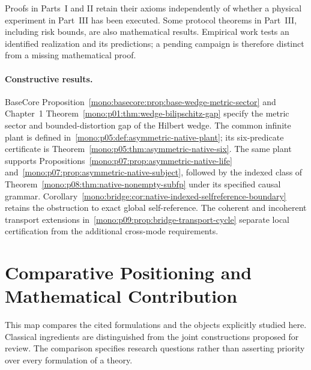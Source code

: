 \documentclass[11pt,a4paper,openany]{book}
\begin{document}
Proofs in Parts~I and II retain their axioms independently of whether a
physical experiment in Part~III has been executed. Some protocol theorems
in Part~III, including risk bounds, are also mathematical results. Empirical
work tests an identified realization and its predictions; a pending campaign
is therefore distinct from a missing mathematical proof.

\paragraph{Constructive results.}
BaseCore Proposition~\ref{mono:basecore:prop:base-wedge-metric-sector} and
Chapter~1 Theorem~\ref{mono:p01:thm:wedge-bilipschitz-gap} specify the metric
sector and bounded-distortion gap of the Hilbert wedge. The common infinite
plant is defined in~\ref{mono:p05:def:asymmetric-native-plant}; its six-predicate
certificate is Theorem~\ref{mono:p05:thm:asymmetric-native-six}. The same plant
supports Propositions~\ref{mono:p07:prop:asymmetric-native-life}
and~\ref{mono:p07:prop:asymmetric-native-subject}, followed by the indexed class
of Theorem~\ref{mono:p08:thm:native-nonempty-subfp} under its specified causal
grammar. Corollary~\ref{mono:bridge:cor:native-indexed-selfreference-boundary}
retains the obstruction to exact global self-reference. The coherent and
incoherent transport extensions in~\ref{mono:p09:prop:bridge-transport-cycle}
separate local certification from the additional cross-mode requirements.

\clearpage
\section*{Comparative Positioning and Mathematical Contribution}
This map compares the cited formulations and the objects explicitly studied
here. Classical ingredients are distinguished from the joint constructions
proposed for review. The comparison specifies research questions rather than
asserting priority over every formulation of a theory.
\end{document}
